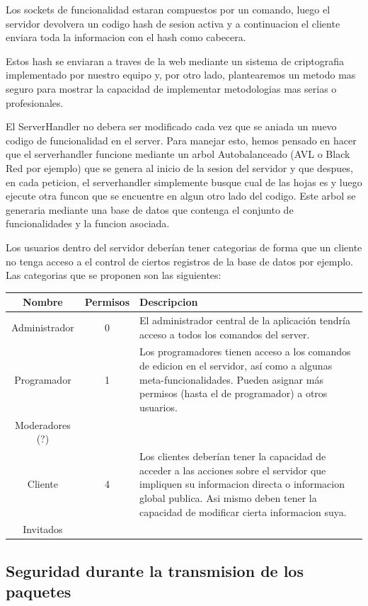 \documentclass{article}
\theoremstyle{definition}
\begin{document}
Los sockets de funcionalidad estaran compuestos por un comando, luego el servidor devolvera un codigo hash de sesion activa y a continuacion el cliente enviara toda la informacion con el hash como cabecera.

Estos hash se enviaran a traves de la web mediante un sistema de criptografia implementado por nuestro equipo y, por otro lado, plantearemos un metodo mas seguro para mostrar la capacidad de implementar metodologias mas serias o profesionales.

El ServerHandler no debera ser modificado cada vez que se aniada un nuevo codigo de funcionalidad en el server. Para manejar esto, hemos pensado en hacer que el serverhandler funcione mediante un arbol Autobalanceado (AVL o Black Red por ejemplo) que se genera al inicio de la sesion del servidor y que despues, en cada peticion, el serverhandler simplemente busque cual de las hojas es y luego ejecute otra funcon que se encuentre en algun otro lado del codigo. Este arbol se generaria mediante una base de datos que contenga el conjunto de funcionalidades y la funcion asociada.


Los usuarios dentro del servidor deberían tener categorias de forma que un cliente no tenga acceso a el control de ciertos registros de la base de datos por ejemplo. Las categorias que se proponen son las siguientes:
\begin{center}
\begin{tabular}{|c|c|p{9cm}|}
\hline Nombre & Permisos & Descripcion \\
\hline Administrador & 0 & El administrador central de la aplicación tendría acceso a todos los comandos del server. \\
Programador & 1 & Los programadores tienen acceso a los comandos de edicion en el servidor, así como a algunas meta-funcionalidades. Pueden asignar más permisos (hasta el de programador) a otros usuarios.\\
Moderadores (?) & & \\
Cliente & 4 & Los clientes deberían tener la capacidad de acceder a las acciones sobre el servidor que impliquen su informacion directa o informacion global publica. Asi mismo deben tener la capacidad de modificar cierta informacion suya. \\
Invitados && \\ \hline

\end{tabular}
\end{center}

\subsection{Seguridad durante la transmision de los paquetes}
\end{document}
